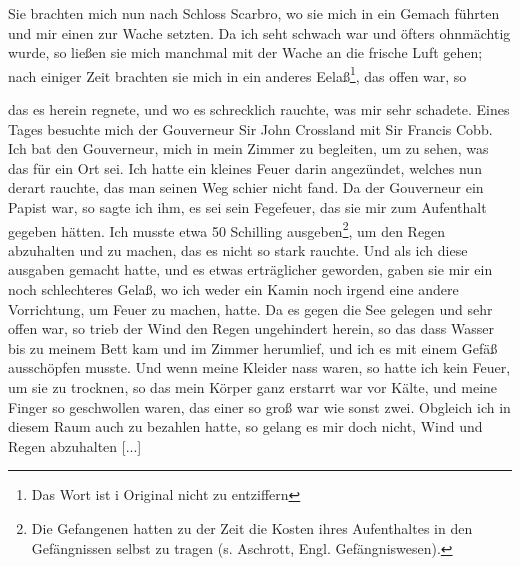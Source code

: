 Sie brachten mich nun nach Schloss Scarbro, wo sie mich in
ein Gemach führten und mir einen zur Wache setzten. Da ich seht
schwach war und öfters ohnmächtig wurde, so ließen sie mich
manchmal mit der Wache an die frische Luft gehen; nach einiger
Zeit brachten sie mich in ein anderes Eelaß\footnote{Das Wort 
ist i Original nicht zu entziffern}, das offen war, so

das es herein regnete, und wo es schrecklich rauchte, was mir
sehr schadete. Eines Tages besuchte mich der Gouverneur Sir
John Crossland mit 
Sir Francis Cobb. Ich 
bat den Gouverneur, mich in mein Zimmer zu begleiten, 
um zu sehen, was das für
ein Ort sei. Ich hatte ein kleines Feuer darin angezündet, welches
nun derart rauchte, das man seinen Weg schier nicht fand. Da
der Gouverneur ein Papist war, so sagte ich ihm, es sei sein
Fegefeuer, das sie mir zum Aufenthalt gegeben hätten. Ich musste
etwa 50 Schilling ausgeben\footnote{Die Gefangenen hatten 
zu der Zeit die Kosten ihres Aufenthaltes in
den Gefängnissen selbst zu tragen (s. Aschrott, Engl. 
Gefängniswesen).}, um den Regen abzuhalten und zu
machen, das es nicht so stark rauchte. Und als ich diese 
ausgaben gemacht hatte, und es etwas erträglicher geworden, gaben
sie mir ein noch schlechteres Gelaß, wo ich weder ein Kamin noch
irgend eine andere Vorrichtung, um Feuer zu machen, hatte. Da
es gegen die See gelegen und sehr offen war, so trieb der Wind
den Regen ungehindert herein, so das dass Wasser bis zu meinem
Bett kam und im Zimmer herumlief, und ich es mit einem Gefäß 
ausschöpfen musste. Und wenn meine Kleider nass waren, so
hatte ich kein Feuer, um sie zu trocknen, so das mein Körper ganz
erstarrt war vor Kälte, und meine Finger so geschwollen waren,
das einer so groß war wie sonst zwei. Obgleich ich in diesem
Raum auch zu bezahlen hatte, so gelang es mir doch nicht, Wind
und Regen abzuhalten [...]

